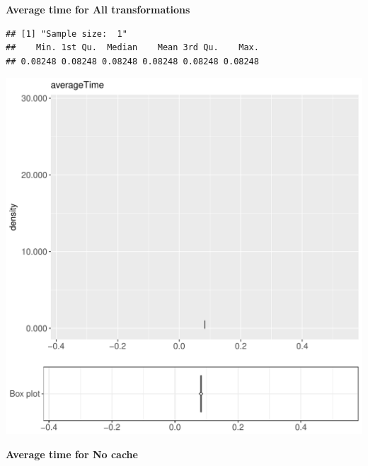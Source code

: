 \documentclass{article}\usepackage[]{graphicx}\usepackage[]{color}
\makeatletter
\def\maxwidth{ %
  \ifdim\Gin@nat@width>\linewidth
    \linewidth
  \else
    \Gin@nat@width
  \fi
}
\newenvironment{kframe}{%
 \def\at@end@of@kframe{}%
 \ifinner\ifhmode%
  \def\at@end@of@kframe{\end{minipage}}%
  \begin{minipage}{\columnwidth}%
 \fi\fi%
 \def\FrameCommand##1{\hskip\@totalleftmargin \hskip-\fboxsep
 \colorbox{shadecolor}{##1}\hskip-\fboxsep
     \hskip-\linewidth \hskip-\@totalleftmargin \hskip\columnwidth}%
 \MakeFramed {\advance\hsize-\width
   \@totalleftmargin\z@ \linewidth\hsize
   \@setminipage}}%
 {\par\unskip\endMakeFramed%
 \at@end@of@kframe}
\newenvironment{knitrout}{}{} %
\makeatother
\begin{document}
 \textbf{Average time for All transformations}
\begin{knitrout}
\color{fgcolor}\begin{kframe}
\begin{verbatim}
## [1] "Sample size:  1"
##    Min. 1st Qu.  Median    Mean 3rd Qu.    Max. 
## 0.08248 0.08248 0.08248 0.08248 0.08248 0.08248
\end{verbatim}


{\ttfamily\noindent\bfseries{}}\end{kframe}
\includegraphics[width=\maxwidth]{figure/RH1_cashew_small-1} 

\end{knitrout}
 \textbf{Average time for No cache}
\end{document}
